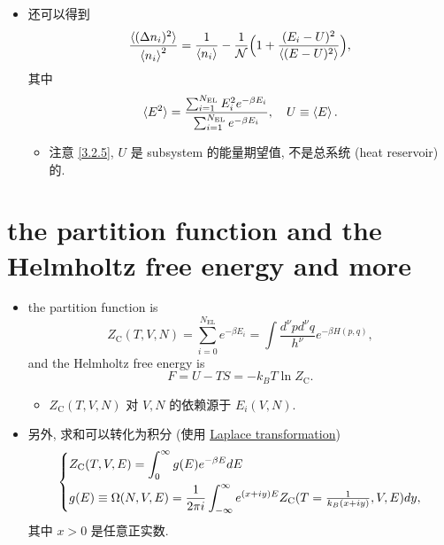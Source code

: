 \begin{itemize}
	\item 还可以得到
	\begin{equation}
		\frac{\braket{(\Delta n_i)^2}}{\braket{n_i}^2} = \frac{1}{\braket{n_i}} - \frac{1}{\mathcal{N}} \Big( 1 + \frac{(E_i - U)^2}{\braket{(E - U)^2}} \Big),
	\end{equation}
	其中
	\begin{equation}
		\braket{E^2} = \frac{\sum_{i = 1}^{N_\text{EL}} E_i^2 e^{- \beta E_i}}{\sum_{i = 1}^{N_\text{EL}} e^{- \beta E_i}}, \quad U \equiv \braket{E}.
	\end{equation}
	\begin{itemize}
		\item 注意 \eqref{3.2.5}, $U$ 是 subsystem 的能量期望值, 不是总系统 (heat reservoir) 的.
	\end{itemize}
\end{itemize}

\section{the partition function and the Helmholtz free energy and more}
\begin{itemize}
	\item the partition function is
	\begin{equation}
		Z_\text{C}(T, V, N) = \sum_{i = 0}^{N_\text{EL}} e^{- \beta E_i} = \int \frac{d^\nu p d^\nu q}{h^\nu} e^{- \beta H(p, q)},
	\end{equation}
	and the Helmholtz free energy is
	\begin{equation}
		F = U - T S = - k_B T \ln Z_\text{C}.
	\end{equation}
	\begin{itemize}
		\item $Z_\text{C}(T, V, N)$ 对 $V, N$ 的依赖源于 $E_i(V, N)$.
	\end{itemize}
	
	\item 另外, 求和可以转化为积分 (使用 \href{https://en.wikipedia.org/wiki/Laplace_transform#Inverse_Laplace_transform}{Laplace transformation})
	\begin{equation}
		\begin{dcases}
			Z_\text{C}(T, V, E) = \int_0^\infty g(E) e^{- \beta E} dE \\
			g(E) \equiv \Omega(N, V, E) = \frac{1}{2 \pi i} \int_{- \infty}^\infty e^{(x + i y) E} Z_\text{C}(T = {\textstyle \frac{1}{k_B (x + i y)}}, V, E) dy,
		\end{dcases}
	\end{equation}
	其中 $x > 0$ 是任意正实数. 
\end{itemize}

